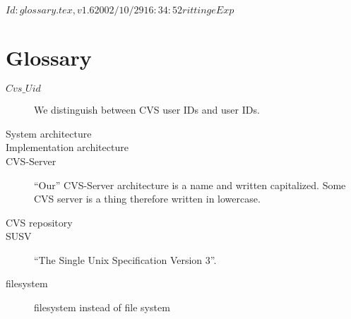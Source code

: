 \rcsInfo $Id: glossary.tex,v 1.6 2002/10/29 16:34:52 rittinge Exp $

\chapter{Glossary}
\begin{description}
\item[$Cvs\_Uid$] We distinguish between CVS user IDs and \unix user IDs.
\item[System architecture] 
\item[Implementation architecture] 
\item[CVS-Server] ``Our'' CVS-Server architecture is a name and written
  capitalized. Some CVS server is a thing therefore written in lowercase.
\item[CVS repository] 
\item[SUSV] ``The Single Unix Specification Version 3''.
\item[filesystem] filesystem instead of file system
\end{description}


